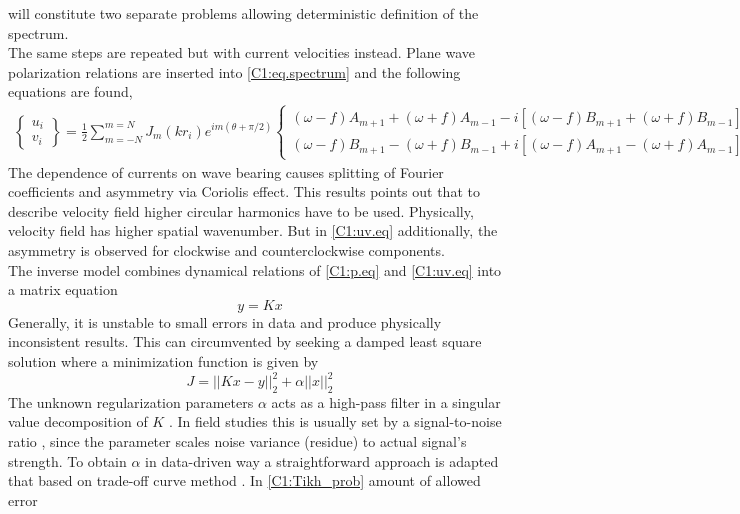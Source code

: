 \documentclass[12pt]{article}
\begin{document}
will constitute two separate problems allowing deterministic definition of the spectrum.\\
The same steps are repeated but with current velocities instead. Plane wave  
polarization relations \citep[e.g.,][]{muller2000scattering} are inserted into 
\eqref{C1:eq.spectrum} and the following equations are found,
\begin{align}
\label{C1:uv.eq}
\begin{Bmatrix}
u_i \\ v_i
\end{Bmatrix}
= \frac{1}{2} \sum_{m = -N}^{m = N} J_{m} (kr_i) e^{im(\theta + \pi/2)}
\begin{Bmatrix}
(\omega - f) A_{m + 1} + (\omega + f) A_{m - 1} - i [(\omega - f) B_{m + 1} + (\omega + f) B_{m - 
1}] \\ 
(\omega - f) B_{m + 1} - (\omega + f) B_{m - 1} + i [ (\omega - f) A_{m + 1} - (\omega + f) A_{m - 
1}]
\end{Bmatrix}
\end{align}
The dependence of currents on wave bearing causes splitting of Fourier coefficients and 
asymmetry via Coriolis effect. This results points out that to describe velocity field 
higher circular harmonics have to be used. Physically, velocity field has higher spatial 
wavenumber. But in \eqref{C1:uv.eq} additionally, the asymmetry is observed 
for clockwise and counterclockwise components.\\
The inverse model combines dynamical relations of \eqref{C1:p.eq} and \eqref{C1:uv.eq} into a 
matrix equation
\begin{equation}
y = K x
\end{equation}
Generally, it is unstable to small errors in data and produce physically inconsistent results. This 
can circumvented by seeking a damped least square solution \citep{munk2009ocean} where a 
minimization function is given by
\begin{equation}
\label{C1:Tikh_prob}
J = ||K x - y||^2_2 + \alpha ||x||^2_2
\end{equation}
The unknown regularization parameters $\alpha$ acts as a high-pass filter in a singular value 
decomposition of $K$ \citep{bennett1992inverse}. In field studies this is usually set by a 
signal-to-noise ratio \citep{munk2009ocean}, since the parameter scales noise variance (residue) 
to actual signal's strength. To obtain $\alpha$ in data-driven way a straightforward approach is 
adapted that based on 
trade-off curve method \citep{hansen1993use}. In \eqref{C1:Tikh_prob} amount of allowed error 
\end{document}
